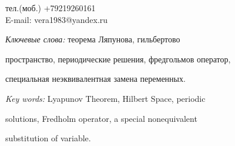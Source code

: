 тел.(моб.) +79219260161\\


E-mail: vera1983@yandex.ru





\textit{Ключевые слова:} теорема Ляпунова, гильбертово


пространство, периодические решения, фредгольмов оператор,


специальная неэквивалентная замена переменных.





\textit{Key words:} Lyapunov Theorem, Hilbert Space, periodic


solutions, Fredholm operator, a special non\-equivalent


substitution of variable.





